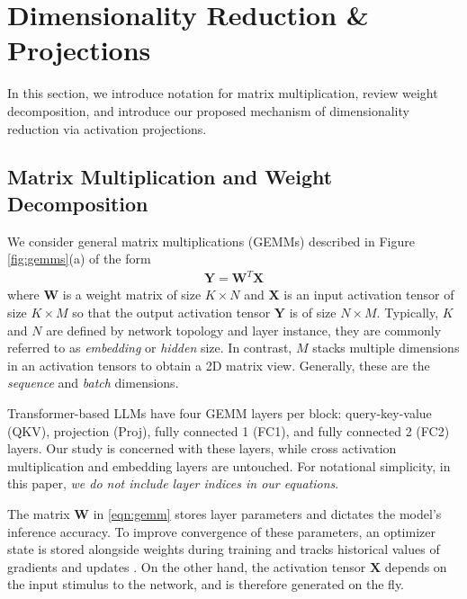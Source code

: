 \documentclass{article}
\theoremstyle{plain}
\begin{document}
\section{Dimensionality Reduction \& Projections}
\label{sec:setup}
In this section, we introduce notation for matrix multiplication, review weight decomposition, and introduce our proposed mechanism of dimensionality reduction via activation projections.
\subsection{Matrix Multiplication and Weight Decomposition}

We consider general matrix multiplications (GEMMs) described in Figure \ref{fig:gemms}(a) of the form
\begin{align}
    \label{eqn:gemm}
    \mathbf{Y}=\mathbf{W}^T \mathbf{X}
\end{align}
where $\mathbf{W}$ is a weight matrix of size $K\times N$ and $\mathbf{X}$ is an input activation tensor of size $K\times M$ so that the output activation tensor $\mathbf{Y}$ is of size $N\times M$. Typically, $K$ and $N$ are defined by network topology and layer instance, they are commonly referred to as \emph{embedding} or \emph{hidden} size. In contrast, $M$ stacks multiple dimensions in an activation tensors to obtain a 2D matrix view. Generally, these are the \emph{sequence} and \emph{batch} dimensions.


Transformer-based LLMs have four GEMM layers per block: query-key-value (QKV), projection (Proj), fully connected 1 (FC1), and fully connected 2 (FC2) layers. Our study is concerned with these layers, while cross activation multiplication and embedding layers are untouched. For notational simplicity, in this paper, \emph{we do not include layer indices in our equations}.

The matrix $\mathbf{W}$ in \eqref{eqn:gemm} stores layer parameters and dictates the model's inference accuracy. To improve convergence of these parameters, an optimizer state is stored alongside weights during training and tracks historical values of gradients and updates \cite{kingma2014adam,hinton2012rmsprop}. On the other hand, the activation tensor $\mathbf{X}$ depends on the input stimulus to the network, and is therefore generated on the fly.
\end{document}
